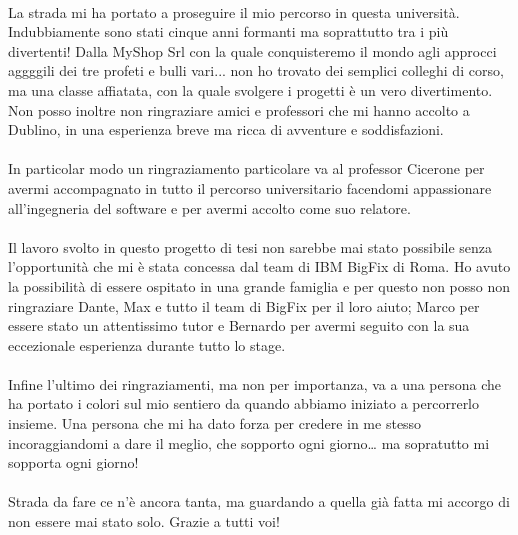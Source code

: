\paragraph{}
La strada mi ha portato a proseguire il mio percorso in questa università. Indubbiamente sono stati cinque anni formanti ma soprattutto tra i più divertenti! Dalla MyShop Srl con la quale conquisteremo il mondo agli approcci aggggili dei tre profeti e bulli vari... non ho trovato dei semplici colleghi di corso, ma una classe affiatata, con la quale svolgere i progetti è un vero divertimento. Non posso inoltre non ringraziare amici e professori che mi hanno accolto a Dublino, in una esperienza breve ma ricca di avventure e soddisfazioni.

\paragraph{}
In particolar modo un ringraziamento particolare va al professor Cicerone per avermi accompagnato in tutto il percorso universitario facendomi appassionare all'ingegneria del software e per avermi accolto come suo relatore.

\paragraph{}
Il lavoro svolto in questo progetto di tesi non sarebbe mai stato possibile senza l'opportunità che mi è stata concessa dal team di IBM BigFix di Roma. Ho avuto la possibilità di essere ospitato in una grande famiglia e per questo non posso non ringraziare Dante, Max e tutto il team di BigFix per il loro aiuto; Marco per essere stato un attentissimo tutor e Bernardo per avermi seguito con la sua eccezionale esperienza durante tutto lo stage.

\paragraph{}
Infine l’ultimo dei ringraziamenti, ma non per importanza, va a una persona che ha portato i colori sul mio sentiero da quando abbiamo iniziato a percorrerlo insieme. Una persona che mi ha dato forza per credere in me stesso incoraggiandomi a dare il meglio, che sopporto ogni giorno… ma sopratutto mi sopporta ogni giorno!

\paragraph{}
Strada da fare ce n'è ancora tanta, ma guardando a quella già fatta mi accorgo di non essere mai stato solo. Grazie a tutti voi!